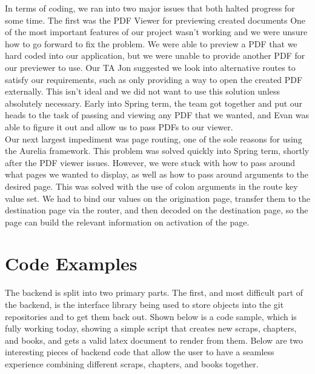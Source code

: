 \documentclass[onecolumn, draftclsnofoot,10pt, compsoc]{IEEEtran}
\begin{document}
\noindent In terms of coding, we ran into two major issues that both halted progress for some time. The first was the PDF Viewer for previewing created documents One of the most important features of our project wasn’t working and we were unsure how to go forward to fix the problem. We were able to preview a PDF that we hard coded into our application, but we were unable to provide another PDF for our previewer to use. Our TA Jon suggested we look into alternative routes to satisfy our requirements, such as only providing a way to open the created PDF externally. This isn't ideal and we did not want to use this solution unless absolutely necessary. Early into Spring term, the team got together and put our heads to the task of passing and viewing any PDF that we wanted, and Evan was able to figure it out and allow us to pass PDFs to our viewer. \\

\noindent Our next largest impediment was page routing, one of the sole reasons for using the Aurelia framework. This problem was solved quickly into Spring term, shortly after the PDF viewer issues. However, we were stuck with how to pass around what pages we wanted to display, as well as how to pass around arguments to the desired page. This was solved with the use of colon arguments in the route key value set. We had to bind our values on the origination page, transfer them to the destination page via the router, and then decoded on the destination page, so the page can build the relevant information on activation of the page. \\


\newpage

\section{Code Examples}
\noindent The backend is split into two primary parts. The first, and most difficult part
of the backend, is the interface library being used to store objects into the
git repositories and to get them back out. Shown below is a code sample, which
is fully working today, showing a simple script that creates new scraps,
chapters, and books, and gets a valid latex document to render from them. 
Below are two interesting pieces of backend code that allow the user to have 
a seamless experience combining different scraps, chapters, and books together.
\end{document}
